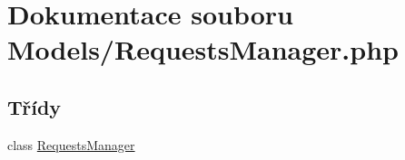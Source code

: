 \hypertarget{_requests_manager_8php}{\section{Dokumentace souboru Models/\-Requests\-Manager.php}
\label{_requests_manager_8php}
}
\subsection*{Třídy}
\begin{DoxyCompactItemize}
\item 
class \hyperlink{class_requests_manager}{Requests\-Manager}
\end{DoxyCompactItemize}
